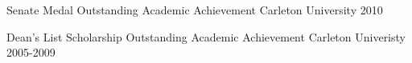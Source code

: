 



\begin{cvhonors}

\cvhonor
{Senate Medal} %
{Outstanding Academic Achievement} %
{Carleton University} %
{2010} %


\cvhonor
{Dean's List Scholarship} %
{Outstanding Academic Achievement} %
{Carleton Univeristy} %
{2005-2009} %


\end{cvhonors}
